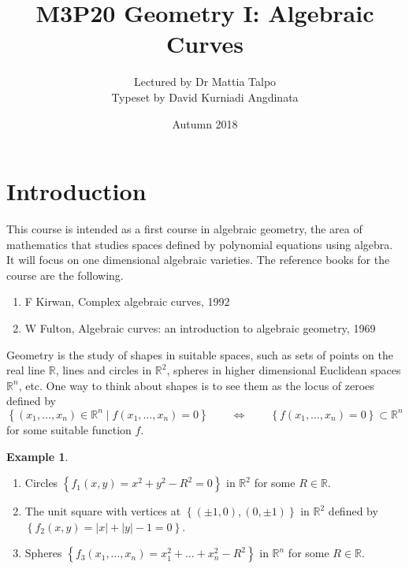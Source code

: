 \documentclass{article}
\title{M3P20 Geometry I: Algebraic Curves}
\author{Lectured by Dr Mattia Talpo \\ Typeset by David Kurniadi Angdinata}
\date{Autumn 2018}
\newcommand{\R}{\mathbb{R}}
\newcommand{\rb}[1]{\left( #1 \right)}
\newcommand{\cb}[1]{\left\{ #1 \right\}}
\newcommand{\abs}[1]{\left\lvert #1 \right\rvert}
\theoremstyle{definition}\newtheorem{definition}{Definition}[section]
\theoremstyle{definition}\newtheorem{notation}[definition]{Notation}
\theoremstyle{definition}\newtheorem{remark}[definition]{Remark}
\theoremstyle{definition}\newtheorem{example}[definition]{Example}
\theoremstyle{definition}\newtheorem{fact}{Fact}
\theoremstyle{definition}\newtheorem{exercise}{Exercise}
\begin{document}
\maketitle

\vfill

\tableofcontents

\pagebreak


\section{Introduction}

This course is intended as a first course in algebraic geometry, the area of mathematics that studies spaces defined by polynomial equations using algebra. It will focus on one dimensional algebraic varieties. The reference books for the course are the following.
\begin{enumerate}
\item F Kirwan, Complex algebraic curves, 1992
\item W Fulton, Algebraic curves: an introduction to algebraic geometry, 1969
\end{enumerate}

Geometry is the study of shapes in suitable spaces, such as sets of points on the real line $ \R $, lines and circles in $ \R^2 $, spheres in higher dimensional Euclidean spaces $ \R^n $, etc. One way to think about shapes is to see them as the locus of zeroes defined by
$$ \cb{\rb{x_1, \dots, x_n} \in \R^n \mid f\rb{x_1, \dots, x_n} = 0} \qquad \iff \qquad \cb{f\rb{x_1, \dots, x_n} = 0} \subset \R^n $$
for some suitable function $ f $.

\begin{example}
\hfill
\begin{enumerate}
\item Circles $ \cb{f_1\rb{x, y} = x^2 + y^2 - R^2 = 0} $ in $ \R^2 $ for some $ R \in \R $.
\item The unit square with vertices at $ \cb{\rb{\pm 1, 0}, \rb{0, \pm 1}} $ in $ \R^2 $ defined by $ \cb{f_2\rb{x, y} = \abs{x} + \abs{y} - 1 = 0} $.
\item Spheres $ \cb{f_3\rb{x_1, \dots, x_n} = x_1^2 + \dots + x_n^2 - R^2} $ in $ \R^n $ for some $ R \in \R $.
\end{enumerate}
\end{example}
\end{document}
